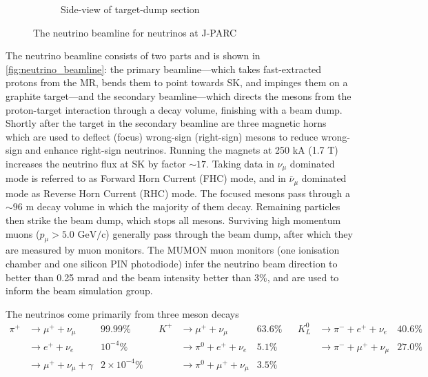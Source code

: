 \begin{figure}[h]
\begin{subfigure}[t]{0.4\textwidth}
		\caption{Side-view of target-dump section}
	\end{subfigure}
	\caption{The neutrino beamline for neutrinos at J-PARC}
	\label{fig:neutrino_beamline}
\end{figure}

The neutrino beamline consists of two parts and is shown in \autoref{fig:neutrino_beamline}: the primary beamline---which takes fast-extracted protons from the MR, bends them to point towards SK, and impinges them on a graphite target---and the secondary beamline---which directs the mesons from the proton-target interaction through a decay volume, finishing with a beam dump. Shortly after the target in the secondary beamline are three magnetic horns\cite{t2k_horns} which are used to deflect (focus) wrong-sign (right-sign) mesons to reduce wrong-sign and enhance right-sign neutrinos. Running the magnets at 250 kA (1.7 T) increases the neutrino flux at SK by factor $\sim17$\cite{t2k_beam}. Taking data in $\nu_\mu$ dominated mode is referred to as Forward Horn Current (FHC) mode, and in $\bar{\nu}_\mu$ dominated mode as Reverse Horn Current (RHC) mode. The focused mesons pass through a $\sim96$ m decay volume in which the majority of them decay. Remaining particles then strike the beam dump, which stops all mesons. Surviving high momentum muons ($p_\mu > 5.0 \text{ GeV/c}$) generally pass through the beam dump, after which they are measured by muon monitors. The MUMON muon monitors (one ionisation chamber and one silicon PIN photodiode) infer the neutrino beam direction to better than 0.25 mrad and the beam intensity better than 3\%\cite{t2k_mumon,t2k_mumon2}, and are used to inform the beam simulation group.

The neutrinos come primarily from three meson decays
\begin{align*}
	\pi^+ & \rightarrow \mu^+ + \nu_\mu 		&  99.99\% 			& & K^+ & \rightarrow \mu^+ + \nu_\mu 			& 63.6\% & & K^0_L & \rightarrow \pi^- + e^+ + \nu_e 	  & 40.6\% \\
	      & \rightarrow e^+ + \nu_e 			&  10^{-4}\%		& &		& \rightarrow \pi^0 + e^+ + \nu_e 		& 5.1\%  & &	   & \rightarrow \pi^- + \mu^+ + \nu_\mu &  27.0\% \\
	      & \rightarrow \mu^+ + \nu_\mu + \gamma & 2\times 10^{-4}\%  & &		& \rightarrow \pi^0 + \mu^+ + \nu_\mu  	& 3.5\%  & &	   & & 		 &
\end{align*}

